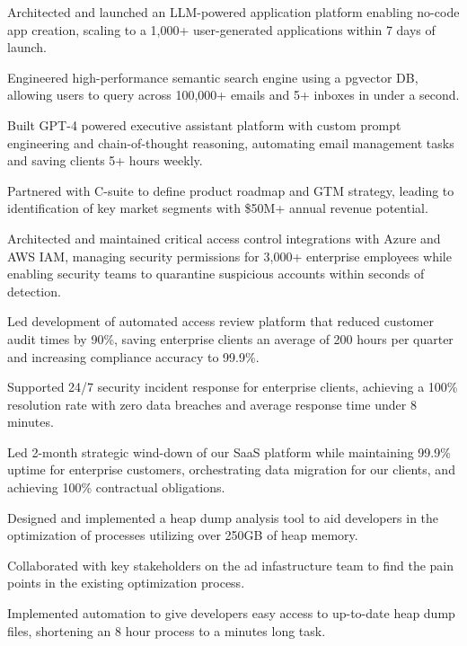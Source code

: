\documentclass[]{deedy-resume-openfont}
\begin{document}
\sectionsep
{}
\hfill {}
\begin{tightemize}
    \item Architected and launched an LLM-powered application platform enabling no-code app creation, scaling to a 1,000+ user-generated applications within 7 days of launch.
    \item Engineered high-performance semantic search engine using a pgvector DB, allowing users to query across 100,000+ emails and 5+ inboxes in under a second.
    \item Built GPT-4 powered executive assistant platform with custom prompt engineering and chain-of-thought reasoning, automating email management tasks and saving clients 5+ hours weekly.
    \item Partnered with C-suite to define product roadmap and GTM strategy, leading to identification of key market segments with \$50M+ annual revenue potential.
    \end{tightemize}

\sectionsep
{}
\hfill {}
\begin{tightemize}
    \item Architected and maintained critical access control integrations with Azure and AWS IAM, managing security permissions for 3,000+ enterprise employees while enabling security teams to quarantine suspicious accounts within seconds of detection.
    \item Led development of automated access review platform that reduced customer audit times by 90\%, saving enterprise clients an average of 200 hours per quarter and increasing compliance accuracy to 99.9\%.
    \item Supported 24/7 security incident response for enterprise clients, achieving a 100\% resolution rate with zero data breaches and average response time under 8 minutes.
    \item Led 2-month strategic wind-down of our SaaS platform while maintaining 99.9\% uptime for enterprise customers, orchestrating data migration for our clients, and achieving 100\% contractual obligations.
    \end{tightemize}

\sectionsep
{}
\hfill {}
\begin{tightemize}
    \item Designed and implemented a heap dump analysis tool to aid developers in the
    optimization of processes utilizing over 250GB of heap memory.
    \item Collaborated with key stakeholders on the ad infastructure team
    to find the pain points in the existing optimization process.
    \item Implemented automation to give developers easy access to up-to-date 
    heap dump files, shortening an 8 hour process to a minutes long task.
\end{tightemize} 
\end{document}
